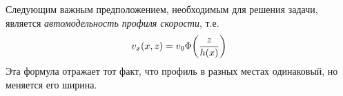 

Следующим важным предположением, необходимым для решения задачи, является \textit{автомодельность профиля скорости},
т.е.
\begin{equation}
    v_x (x,z) = v_0 \Phi\qty(\frac{z}{h(x)})
\end{equation}
Эта формула отражает тот факт, что профиль в разных местах одинаковый, 
но меняется его ширина.

